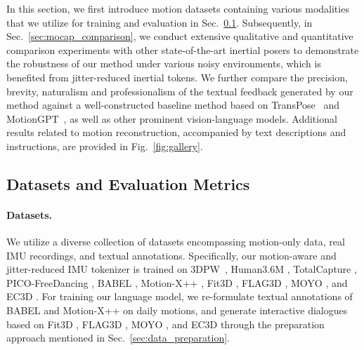 In this section, we first introduce motion datasets containing various modalities that we utilize for training and evaluation in Sec.~\ref{sec:datasets}. Subsequently, in Sec.~\ref{sec:mocap_comparison}, we conduct extensive qualitative and quantitative comparison experiments with other state-of-the-art inertial posers to demonstrate the robustness of our method under various noisy environments, which is benefited from jitter-reduced inertial tokens. 
We further compare the precision, brevity, naturalism and professionalism of the textual feedback generated by our method against a well-constructed baseline method based on TransPose~\cite{TransPoseSIGGRAPH2021} and MotionGPT~\cite{jiang2023motiongpt}, as well as other prominent vision-language models. Additional results related to motion reconstruction, accompanied by text descriptions and instructions, are provided in Fig.~\ref{fig:gallery}.

\subsection{Datasets and Evaluation Metrics}
\label{sec:datasets}

\paragraph{Datasets.} We utilize a diverse collection of datasets encompassing motion-only data, real IMU recordings, and textual annotations. Specifically, our motion-aware and jitter-reduced IMU tokenizer is trained on 3DPW~\cite{vonMarcard2018}, Human3.6M \cite{h36m_pami}, TotalCapture \cite{trumble2017total}, PICO-FreeDancing \cite{dai2024hmd}, BABEL \cite{AMASS:ICCV:2019,BABEL:CVPR:2021}, Motion-X++ \cite{lin2024motion}, Fit3D \cite{Fieraru_2021_CVPR}, FLAG3D \cite{tang2023flag3d}, MOYO \cite{tripathi2023ipman}, and EC3D \cite{zhao2022exercise}. For training our language model, we re-formulate textual annotations of BABEL \cite{AMASS:ICCV:2019,BABEL:CVPR:2021} and Motion-X++ \cite{lin2024motion} on daily motions, and generate interactive dialogues based on Fit3D \cite{Fieraru_2021_CVPR}, FLAG3D \cite{tang2023flag3d}, MOYO \cite{tripathi2023ipman}, and EC3D \cite{zhao2022exercise} through the preparation approach mentioned in Sec.~\ref{sec:data_preparation}.

